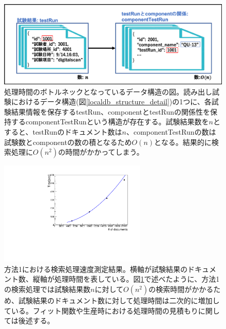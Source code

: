\begin{figure}[bpt]
  \begin{center}
    \includegraphics[width=12cm]{./search_python_testRun.png}
  \caption[処理時間のボトルネックとなっているデータ構造]{処理時間のボトルネックとなっているデータ構造の図。読み出し試験におけるデータ構造(図\ref{localdb_structure_detail})の1つに、各試験結果情報を保存するtestRun、componentとtestRunの関係性を保持するcomponentTestRunという構造が存在する。試験結果数を$n$とすると、testRunのドキュメント数は$n$、componentTestRunの数は試験数とcomponentの数の積となるため$O(n)$となる。結果的に検索処理に$O(n^2)$の時間がかかってしまう。}
  \label{search_python_testRun}
  \end{center}
\end{figure}

\begin{figure}[bpt]
  \begin{center}
    \includegraphics[width=7cm,angle=270]{./result_python_list_search.pdf}
  \caption[方法1における検索処理速度測定結果]{方法1における検索処理速度測定結果。横軸が試験結果のドキュメント数、縦軸が処理時間を表している。図\ref{search_python_testRun}で述べたように、方法1の検索処理では試験結果数$n$に対して$O(n^2)$の検索時間がかかるため、試験結果のドキュメント数に対して処理時間は二次的に増加している。フィット関数や生産時における処理時間の見積もりに関しては後述する。}
  \label{searching_time_python_list}
  \end{center}
\end{figure}


